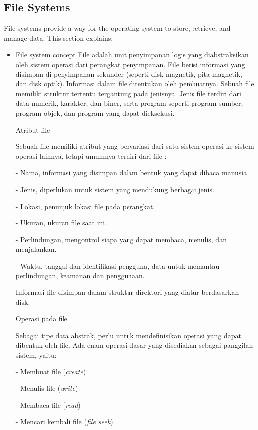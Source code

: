 \documentclass[12pt]{article}
\begin{document}
\subsection{File Systems}
File systems provide a way for the operating system to store, retrieve, and manage data. This section explains:
\begin{itemize}
    \item File system concept
    File adalah unit penyimpanan logis yang diabstraksikan oleh sistem operasi dari perangkat penyimpanan. File berisi informasi yang disimpan di penyimpanan sekunder (seperti disk magnetik, pita magnetik, dan disk optik). Informasi dalam file ditentukan oleh pembuatnya. Sebuah file memiliki struktur tertentu tergantung pada jenisnya. Jenis file terdiri dari data numerik, karakter, dan biner, serta program seperti program sumber, program objek, dan program yang dapat dieksekusi.
    
    Atribut file 

    Sebuah file memiliki atribut yang bervariasi dari satu sistem operasi ke sistem operasi lainnya, tetapi umumnya terdiri dari file : 

    - Nama, informasi yang disimpan dalam bentuk yang dapat dibaca manusia  
    
    - Jenis, diperlukan untuk sistem yang mendukung berbagai jenis. 
    
     - Lokasi, penunjuk lokasi file pada perangkat. 
    
     - Ukuran, ukuran file saat ini. 
    
     - Perlindungan, mengontrol siapa yang dapat membaca, menulis, dan menjalankan. 
    
      - Waktu, tanggal dan identifikasi pengguna, data untuk memantau perlindungan, keamanan dan penggunaan. 

        Informasi file disimpan dalam struktur direktori yang diatur berdasarkan disk. 
    
        Operasi pada file 
    
             	Sebagai tipe data abstrak, perlu untuk mendefinisikan operasi yang dapat dibentuk oleh file. Ada enam operasi dasar yang disediakan sebagai panggilan sistem, yaitu: 
    
     		- Membuat file (\textit{create})  
    
     		- Menulis file (\textit{write})  
    
     		- Membaca file (\textit{read}) 
    
     		- Mencari kembali file (\textit{file seek}) 
    

\end{itemize}
\end{document}
